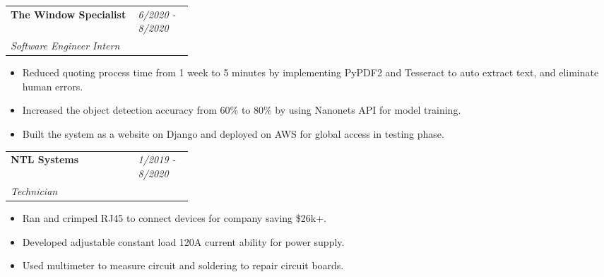 \documentclass[11pt]{article} %
\begin{document}
\begin{paracol}{2}



\begin{supertabular}{p{.65\linewidth}p{0.3\linewidth}}
   \Large\textbf{The Window Specialist} \raggedright & \textit{6/2020 - 8/2020} \\ 
   \textit{Software Engineer Intern} \\
\end{supertabular}
\begin{itemize}
	\setlength\itemsep{-0.5em}
    \item Reduced quoting process time from 1 week to 5 minutes by implementing PyPDF2 and Tesseract to auto extract text, 
	and eliminate human errors.
	\item Increased the object detection accuracy from 60\% to 80\% by using Nanonets API for model training.
	\item Built the system as a website on Django and deployed on AWS for global access in testing phase.
\end{itemize}

\begin{supertabular}{p{.65\linewidth}p{0.3\linewidth}}
   \Large\textbf{NTL Systems} \raggedright & \textit{1/2019 - 8/2020} \\ 
   \textit{Technician} \\
\end{supertabular}
\begin{itemize}
	\setlength\itemsep{-0.5em}
    \item Ran and crimped RJ45 to connect devices for company saving \$26k+.
    \item Developed adjustable constant load 120A current ability for power supply.
    \item Used multimeter to measure circuit and soldering to repair circuit boards.
\end{itemize}



\end{paracol}
\end{document}
